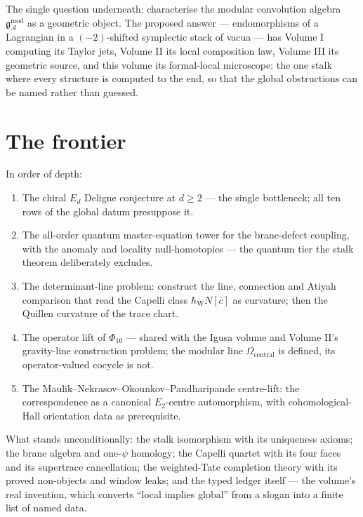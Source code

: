 \documentclass[11pt]{article}
\providecommand{\cA}{\mathcal{A}}
\providecommand{\fg}{\mathfrak{g}}
\providecommand{\Phiten}{\Phi_{10}}
\providecommand{\hbW}{\hbar_{\mathrm{W}}}
\begin{document}
The single question underneath: characterise the modular convolution
algebra $\fg^{\mathrm{mod}}_\cA$ as a geometric object. The proposed
answer --- endomorphisms of a Lagrangian in a $(-2)$-shifted
symplectic stack of vacua --- has Volume I computing its Taylor jets,
Volume II its local composition law, Volume III its geometric source,
and this volume its formal-local microscope: the one stalk where
every structure is computed to the end, so that the global
obstructions can be named rather than guessed.

\section{The frontier}\label{sec:frontier}

In order of depth:

\begin{enumerate}
\item The chiral $E_d$ Deligne conjecture at $d\ge2$ --- the single
bottleneck; all ten rows of the global datum presuppose it.
\item The all-order quantum master-equation tower for the
brane-defect coupling, with the anomaly and locality null-homotopies
--- the quantum tier the stalk theorem deliberately excludes.
\item The determinant-line problem: construct the line, connection
and Atiyah comparison that read the Capelli class $\hbW N[\bar c]$ as
curvature; then the Quillen curvature of the trace chart.
\item The operator lift of $\Phiten$ --- shared with the Igusa volume
and Volume II's gravity-line construction problem; the modular line
$\Omega_{\mathrm{central}}$ is defined, its operator-valued cocycle is
not.
\item The Maulik--Nekrasov--Okounkov--Pandharipande centre-lift: the
correspondence as a canonical $E_2$-centre automorphism, with
cohomological-Hall orientation data as prerequisite.
\end{enumerate}

What stands unconditionally: the stalk isomorphism with its
uniqueness axioms; the brane algebra and one-$\psi$ homology; the
Capelli quartet with its four faces and its supertrace cancellation;
the weighted-Tate completion theory with its proved non-objects and
window leaks; and the typed ledger itself --- the volume's real
invention, which converts ``local implies global'' from a slogan into
a finite list of named data.
\end{document}
